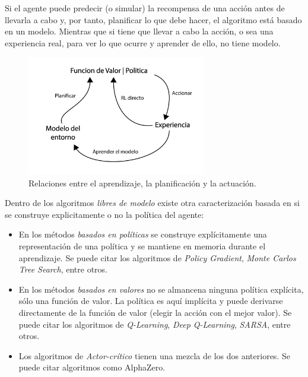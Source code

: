 Si el agente puede predecir (o simular) la recompensa de una acción antes de llevarla a cabo y, por tanto, planificar lo que debe hacer, el algoritmo está basado en un modelo. Mientras que si tiene que llevar a cabo la acción, o sea una experiencia real, para ver lo que ocurre y aprender de ello, no tiene modelo.

\begin{figure}[ht!]
    \centering
    \includegraphics[width=0.7\textwidth]{Graphics/rl-strategies.png}
    \caption{Relaciones entre el aprendizaje, la planificación y la actuación.}
    \label{fig:rl-strategies}
\end{figure}


Dentro de los algoritmos  \textit{libres de modelo} existe otra caracterización basada en si se construye explicitamente o no la política del agente:

\begin{itemize}
\item En los métodos \textit{basados en políticas} se construye explícitamente una representación de una política y se mantiene en memoria durante el aprendizaje. Se puede citar los algoritmos de \textit{Policy Gradient}, \textit{Monte Carlos Tree Search}, entre otros.

\item En los métodos \textit{basados en valores} no se almancena ninguna política explícita, sólo una función de valor. La política es aquí implícita y puede derivarse directamente de la función de valor (elegir la acción con el mejor valor). Se puede citar los algoritmos de \textit{Q-Learning}, \textit{Deep Q-Learning}, \textit{SARSA}, entre otros.

\item Los algoritmos de \textit{Actor-crítico} tienen una mezcla de los dos anteriores. Se puede citar algoritmos como AlphaZero.
\end{itemize}

